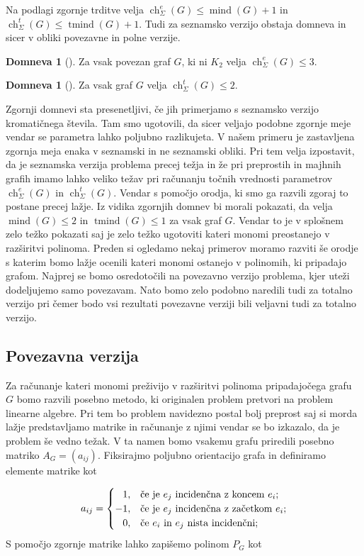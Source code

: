 \documentclass[12pt,a4paper,twoside]{article}
\theoremstyle{definition} %
\newtheorem{domneva}[definicija]{Domneva}
\theoremstyle{plain} %
\newcommand{\ecl}{\ch_{\Sigma}^e}
\newcommand{\eclt}{\ch_{\Sigma}^t}
\numberwithin{equation}{section}  %
\DeclareMathOperator{\mind}{mind}
\DeclareMathOperator{\tmind}{tmind}
\DeclareMathOperator{\ch}{ch}
\begin{document}
Na podlagi zgornje trditve velja $\ecl(G) \le \mind(G) + 1$ in $\eclt(G) \le \tmind(G) + 1$. Tudi za seznamsko verzijo obstaja domneva in sicer v obliki povezavne in polne verzije.

 \begin{domneva}[\cite{alg_org}]
Za vsak povezan graf $G$, ki ni $K_2$ velja $\ecl(G) \le 3$.
\end{domneva}

 \begin{domneva}[\cite{algebraic}]
Za vsak  graf $G$ velja $\eclt(G) \le 2$.
\end{domneva}
Zgornji domnevi sta presenetljivi, če jih primerjamo s seznamsko verzijo kromatičnega števila. Tam smo ugotovili, da sicer veljajo podobne zgornje meje vendar se parametra lahko poljubno razlikujeta. V našem primeru je zastavljena zgornja meja enaka v seznamski in ne seznamski obliki. Pri tem velja izpostavit, da je seznamska verzija problema precej težja in že pri preprostih in majhnih grafih imamo lahko veliko težav pri računanju točnih vrednosti parametrov $\ecl(G)$ in $\eclt(G)$. Vendar s pomočjo orodja, ki smo ga razvili zgoraj to postane precej lažje. Iz vidika zgornjih domnev bi morali pokazati, da velja $\mind(G) \le 2 $ in $\tmind(G) \le 1$ za vsak graf $G$. Vendar to je v splošnem zelo težko pokazati saj je zelo težko ugotoviti kateri monomi preostanejo v razširitvi polinoma. Preden si ogledamo nekaj primerov moramo razviti še orodje s katerim bomo lažje ocenili kateri monomi ostanejo v polinomih, ki pripadajo grafom. Najprej se bomo osredotočili na povezavno verzijo problema, kjer uteži dodeljujemo samo povezavam. Nato bomo zelo podobno naredili tudi za totalno verzijo pri čemer bodo vsi rezultati povezavne verziji bili veljavni tudi za totalno verzijo.

\subsection{Povezavna verzija}
Za računanje kateri monomi preživijo v razširitvi polinoma pripadajočega grafu $G$ bomo razvili posebno metodo, ki originalen problem pretvori na problem linearne algebre. Pri tem bo problem navidezno postal bolj preprost saj si morda lažje predstavljamo matrike in računanje z njimi vendar se bo izkazalo, da je problem še vedno težak.
 V ta namen bomo vsakemu grafu priredili posebno matriko $A_G = (a_{ij})$. Fiksirajmo poljubno orientacijo grafa in definiramo elemente matrike kot 

\begin{equation*}
a_{ij} = 
\begin{cases}

\phantom{-}1, & \text{če je $e_j$ incidenčna z koncem $e_i$} ;\\ 
	-1, & \text{če je $ e_j$ incidenčna z začetkom  $e_i$} ;\\

\phantom{-}0, & \text{če $e_i$ in $e_j$ nista incidenčni;}
\end{cases}
\end{equation*}
S pomočjo zgornje matrike lahko zapišemo polinom $P_G$ kot
\end{document}
